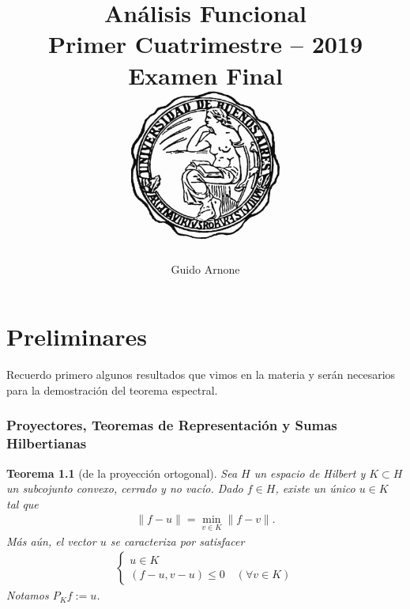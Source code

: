\documentclass[11pt]{report}
\title{
\LARGE{Análisis Funcional}
\\
\vspace{1pt}
\small{Primer Cuatrimestre -- 2019}
\\
\vspace{0.5pt}
\large{Examen Final}
\\
\vspace{80pt}
{\includegraphics[height=5cm]{uba2.jpg}}
\vspace{80pt}
}
\author{Guido Arnone}
\date{}
\theoremstyle{colored}
\newtheorem{theorem}{Teorema}[section]
\newcommand{\ip}[1]{( #1 )}
\begin{document}
\maketitle
\tableofcontents

\chapter{Preliminares}
Recuerdo primero algunos resultados que vimos en la materia y serán necesarios para la demostración del teorema espectral.
\subsection{Proyectores, Teoremas de Representación y Sumas Hilbertianas}

\begin{theorem}[de la proyección ortogonal] Sea $H$ un espacio de Hilbert y $K \subset H$ un subcojunto convexo, cerrado y no vacío. Dado $f \in H$, existe un único $u \in K$ tal que
\begin{align*}
\|f-u\| = \min_{v \in K}\|f-v\|.
\end{align*}
Más aún, el vector $u$ se caracteriza por satisfacer
\begin{align*}
\begin{cases}
u \in K\\
\ip{f-u,v-u} \leq 0 \quad (\forall v \in K)
\end{cases}
\end{align*}
Notamos $P_Kf := u$.
\end{theorem}
\end{document}
